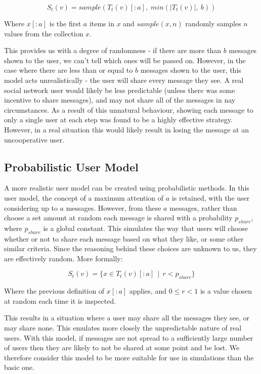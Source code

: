 \documentclass[bsc,frontabs,twoside,singlespacing,parskip,deptreport]{infthesis}     %
\begin{document}
\begin{equation}
S_{t}(v) = \mathit{sample}(T_{t}(v)[:a], \; \mathit{min}(|T_{t}(v)|,\: b))
\end{equation}

Where $x[:a]$ is the first $a$ items in $x$ and $sample(x, n)$ randomly samples $n$ values from the collection $x$.

This provides us with a degree of randomness - if there are more than $b$ messages shown to the user, we can't tell which ones will be passed on. However, in the case where there are less than or equal to $b$ messages shown to the user, this model acts unrealistically - the user will share every message they see. A real social network user would likely be less predictable (unless there was some incentive to share messages), and may not share all of the messages in nay circumstances. As a result of this unnatural behaviour, showing each message to only a single user at each step was found to be a highly effective strategy. However, in a real situation this would likely result in losing the message at an uncooperative user.

\subsection{Probabilistic User Model}
A more realistic user model can be created using probabilistic methods. In this user model, the concept of a maximum attention of $a$ is retained, with the user considering up to $a$ messages. However, from these $a$ messages, rather than choose a set amount at random each message is shared with a probability $p_{share}$, where $p_{share}$ is a global constant. This simulates the way that users will choose whether or not to share each message based on what they like, or some other similar criteria. Since the reasoning behind these choices are unknown to us, they are effectively random. More formally:

\begin{equation}
S_{t}(v) = \{x \in T_{t}(v)[:a] \:\: | \:\:  r < p_{share}\}
\end{equation}

Where the previous definition of $x[:a]$ applies, and $0 \leq r < 1$ is a value chosen at random each time it is inspected. 

This results in a situation where a user may share all the messages they see, or may share none. This emulates more closely the unpredictable nature of real users. With this model, if messages are not spread to a sufficiently large number of users then they are likely to not be shared at some point and be lost. We therefore consider this model to be more suitable for use in simulations than the basic one.
\end{document}
